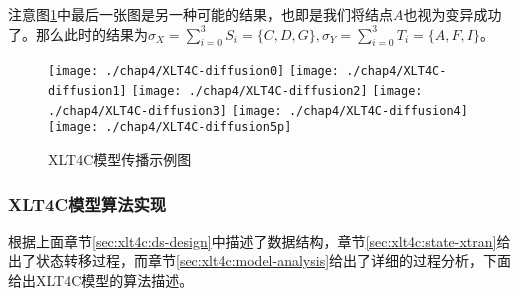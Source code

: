 注意图\ref{fig:chap4:xcic-demo}中最后一张图是另一种可能的结果，也即是我们将结点$A$也视为变异成功了。那么此时的结果为$\sigma_{X}=\sum_{i=0}^{3}S_{i}=\{C, D, G\}, \sigma_{Y}=\sum_{i=0}^{3}T_{i}=\{A, F, I\}$。

\begin{figure}[H]
	\centering%
	{\texttt{[image: ./chap4/XLT4C-diffusion0]}}
	\hspace{3em}%
	{\texttt{[image: ./chap4/XLT4C-diffusion1]}}
	\hspace{3em}%
	{\texttt{[image: ./chap4/XLT4C-diffusion2]}}
	\hspace{3em}%
	{\texttt{[image: ./chap4/XLT4C-diffusion3]}}
	\hspace{3em}%
	{\texttt{[image: ./chap4/XLT4C-diffusion4]}}
	\hspace{3em}%
	{\texttt{[image: ./chap4/XLT4C-diffusion5p]}}
	\caption{XLT4C模型传播示例图}
	\label{fig:chap4:xcic-demo}
\end{figure}


\subsubsection{XLT4C模型算法实现}
根据上面章节\ref{sec:xlt4c:ds-design}中描述了数据结构，章节\ref{sec:xlt4c:state-xtran}给出了状态转移过程，而章节\ref{sec:xlt4c:model-analysis}给出了详细的过程分析，下面给出XLT4C模型的算法描述。

